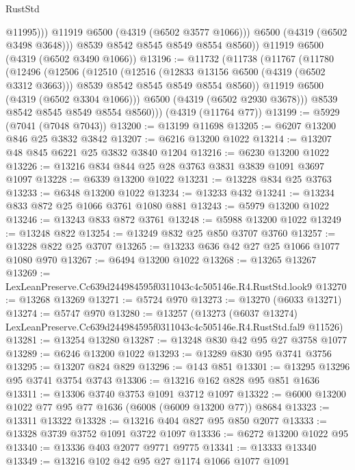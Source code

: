 \begin{lexlean}{RustStd}
\begin{coremodule}
                  @11995)))
            @11919
            @6500
            (@4319 (@6502 @3577 @1066)))
          @6500
          (@4319 (@6502 @3498 @3648)))
        @8539
        @8542
        @8545
        @8549
        @8554
        @8560))
    @11919
    @6500
    (@4319 (@6502 @3490 @1066))
@13196 := @11732
    (@11738
      (@11767
        (@11780
          (@12496
            (@12506
              (@12510
                (@12516
                  (@12833 @13156 @6500 (@4319 (@6502 @3312 @3663)))
                  @8539
                  @8542
                  @8545
                  @8549
                  @8554
                  @8560))
              @11919
              @6500
              (@4319 (@6502 @3304 @1066)))
            @6500
            (@4319 (@6502 @2930 @3678)))
          @8539
          @8542
          @8545
          @8549
          @8554
          @8560)))
    (@4319 (@11764 @77))
@13199 := @5929 (@7041 (@7048 @7043))
@13200 := @13199 @11698
@13205 := @6207 @13200 @846 @25 @3832 @3842
@13207 := @6216 @13200 @1022
@13214 := @13207 @48 @845 @6221 @25 @3832 @3840 @1204
@13216 := @6230 @13200 @1022
@13226 := @13216 @834 @844 @25 @28 @3763 @3831 @3839 @1091 @3697 @1097
@13228 := @6339 @13200 @1022
@13231 := @13228 @834 @25 @3763
@13233 := @6348 @13200 @1022
@13234 := @13233 @432
@13241 := @13234 @833 @872 @25 @1066 @3761 @1080 @881
@13243 := @5979 @13200 @1022
@13246 := @13243 @833 @872 @3761
@13248 := @5988 @13200 @1022
@13249 := @13248 @822
@13254 := @13249 @832 @25 @850 @3707 @3760
@13257 := @13228 @822 @25 @3707
@13265 := @13233 @636 @42 @27 @25 @1066 @1077 @1080 @970
@13267 := @6494 @13200 @1022
@13268 := @13265 @13267
@13269 := LexLeanPreserve.Cc639d244984595f0311043c4c505146e.R4.RustStd.look9
@13270 := @13268 @13269
@13271 := @5724 @970
@13273 := @13270 (@6033 @13271)
@13274 := @5747 @970
@13280 := @13257
    (@13273 (@6037 @13274) LexLeanPreserve.Cc639d244984595f0311043c4c505146e.R4.RustStd.fal9 @11526)
@13281 := @13254 @13280
@13287 := @13248 @830 @42 @95 @27 @3758 @1077
@13289 := @6246 @13200 @1022
@13293 := @13289 @830 @95 @3741 @3756
@13295 := @13207 @824 @829
@13296 := @143 @851
@13301 := @13295 @13296 @95 @3741 @3754 @3743
@13306 := @13216 @162 @828 @95 @851 @1636
@13311 := @13306 @3740 @3753 @1091 @3712 @1097
@13322 := @6000 @13200 @1022 @77 @95 @77 @1636 (@6008 (@6009 @13200 @77)) @8684
@13323 := @13311 @13322
@13328 := @13216 @404 @827 @95 @850 @2077
@13333 := @13328 @3739 @3752 @1091 @3722 @1097
@13336 := @6272 @13200 @1022 @95
@13340 := @13336 @403 @2077 @9771 @9775
@13341 := @13333 @13340
@13349 := @13216 @102 @42 @95 @27 @1174 @1066 @1077 @1091

\end{coremodule}
\end{lexlean}
